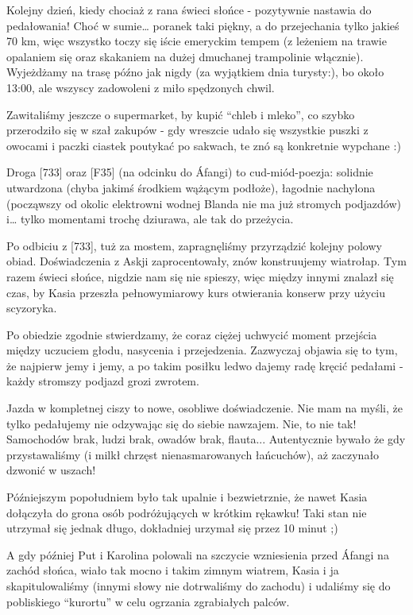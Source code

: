 Kolejny dzień, kiedy chociaż z rana świeci słońce - pozytywnie nastawia do pedałowania! Choć w sumie… poranek taki piękny, a do przejechania tylko jakieś 70 km, więc wszystko toczy się iście emeryckim tempem (z leżeniem na trawie opalaniem się oraz skakaniem na dużej dmuchanej trampolinie włącznie). Wyjeżdżamy na trasę późno jak nigdy (za wyjątkiem dnia turysty:), bo około 13:00, ale wszyscy zadowoleni z miło spędzonych chwil.

Zawitaliśmy jeszcze o supermarket, by kupić “chleb i mleko”, co szybko przerodziło się w szał zakupów - gdy wreszcie udało się wszystkie puszki z owocami i paczki ciastek poutykać po sakwach, te znó są konkretnie wypchane :)

Droga [733] oraz [F35] (na odcinku do Áfangi) to cud-miód-poezja: solidnie utwardzona (chyba jakimś środkiem wążącym podłoże), łagodnie nachylona (począwszy od okolic elektrowni wodnej Blanda nie ma już stromych podjazdów) i… tylko momentami trochę dziurawa, ale tak do przeżycia.

Po odbiciu z [733], tuż za mostem, zapragnęliśmy przyrządzić kolejny polowy obiad. Doświadczenia z Askji zaprocentowały, znów konstruujemy wiatrołap. Tym razem świeci słońce, nigdzie nam się nie spieszy, więc między innymi znalazł się czas, by Kasia przeszła pełnowymiarowy kurs otwierania konserw przy użyciu scyzoryka.

Po obiedzie zgodnie stwierdzamy, że coraz ciężej uchwycić moment przejścia między uczuciem głodu, nasycenia i przejedzenia. Zazwyczaj objawia się to tym, że najpierw jemy i jemy, a po takim posiłku ledwo dajemy radę kręcić pedałami - każdy stromszy podjazd grozi zwrotem.

Jazda w kompletnej ciszy to nowe, osobliwe doświadczenie. Nie mam na myśli, że tylko pedałujemy nie odzywając się do siebie nawzajem. Nie, to nie tak! Samochodów brak, ludzi brak, owadów brak, flauta... Autentycznie bywało że gdy przystawaliśmy (i milkł chrzęst nienasmarowanych łańcuchów), aż zaczynało dzwonić w uszach!

Późniejszym popołudniem było tak upalnie i bezwietrznie, że nawet Kasia dołączyła do grona osób podróżujących w krótkim rękawku! Taki stan nie utrzymał się jednak długo, dokładniej urzymał się przez 10 minut ;)

A gdy później Put i Karolina polowali na szczycie wzniesienia przed Áfangi na zachód słońca, wiało tak mocno i takim zimnym wiatrem, Kasia i ja skapitulowaliśmy (innymi słowy nie dotrwaliśmy do zachodu) i udaliśmy się do pobliskiego “kurortu” w celu ogrzania zgrabiałych palców.

